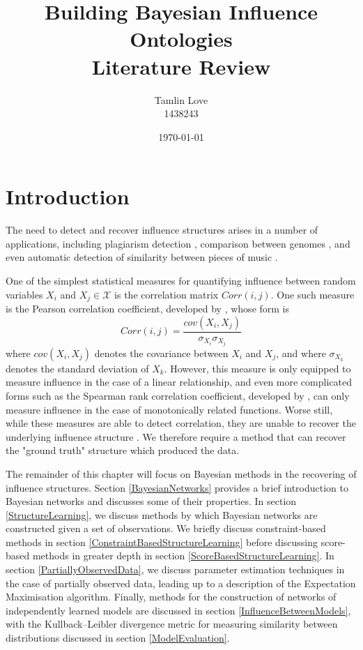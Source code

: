 \documentclass [11pt]{article}
\title{Building Bayesian Influence Ontologies\\Literature Review}
\author{Tamlin Love\\1438243}
\date{\today}
\begin{document}
\maketitle
\section{Introduction}
The need to detect and recover influence structures arises in a number of applications, including plagiarism detection \citep{merlo2007}, comparison between genomes \citep{koonin1999}, and even automatic detection of similarity between pieces of music \citep{slaney2008}.

One of the simplest statistical measures for quantifying influence between random variables $X_{i}$ and $X_{j} \in \mathcal{X}$ is the correlation matrix $Corr(i,j)$. One such measure is the Pearson correlation coefficient, developed by \cite{pearson1895}, whose form is
\begin{equation*}
Corr(i,j) = \frac{cov(X_{i},X_{j})}{\sigma_{X_{i}} \sigma_{X_{j}}}
\end{equation*}
where $cov(X_{i},X_{j})$ denotes the covariance between $X_{i}$ and $X_{j}$, and where $\sigma_{X_{k}}$ denotes the standard deviation of $X_{k}$. However, this measure is only equipped to measure influence in the case of a linear relationship, and even more complicated forms such as the Spearman rank correlation coefficient, developed by \cite{spearman1904}, can only measure influence in the case of monotonically related functions. Worse still, while these measures are able to detect correlation, they are unable to recover the underlying influence structure \citep{damghani2012}. We therefore require a method that can recover the "ground truth" structure which produced the data.

The remainder of this chapter will focus on Bayesian methods in the recovering of influence structures. Section \ref{BayesianNetworks} provides a brief introduction to Bayesian networks and discusses some of their properties. In section \ref{StructureLearning}, we discuss methods by which Bayesian networks are constructed given a set of observations. We briefly discuss constraint-based methods in section \ref{ConstraintBasedStructureLearning} before discussing score-based methods in greater depth in section \ref{ScoreBasedStructureLearning}. In section \ref{PartiallyObservedData}, we discuss parameter estimation techniques in the case of partially observed data, leading up to a description of the Expectation Maximisation algorithm. Finally, methods for the construction of networks of independently learned models are discussed in section \ref{InfluenceBetweenModels}, with the Kullback–Leibler divergence metric for measuring similarity between distributions discussed in section \ref{ModelEvaluation}.
\end{document}
